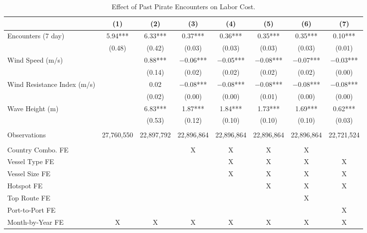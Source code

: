 \begin{table}
\centering
\caption{Effect of Past Pirate Encounters on Labor Cost. \label{tab:spec-labor-table}}
\centering
\begin{adjustbox}{width = .9\textwidth}
\begin{threeparttable}
\begin{tabular}[t]{lccccccc}
\toprule
  & (1) & (2) & (3) & (4) & (5) & (6) & (7)\\
\midrule
Encounters (7 day) & \num{5.94}*** & \num{6.33}*** & \num{0.37}*** & \num{0.36}*** & \num{0.35}*** & \num{0.35}*** & \num{0.10}***\\
 & (\num{0.48}) & (\num{0.42}) & (\num{0.03}) & (\num{0.03}) & (\num{0.03}) & (\num{0.03}) & (\num{0.01})\\
Wind Speed (m/s) &  & \num{0.88}*** & \num{-0.06}*** & \num{-0.05}*** & \num{-0.08}*** & \num{-0.07}*** & \num{-0.03}***\\
 &  & (\num{0.14}) & (\num{0.02}) & (\num{0.02}) & (\num{0.02}) & (\num{0.02}) & (\num{0.00})\\
Wind Resistance Index (m/s) &  & \num{0.02} & \num{-0.08}*** & \num{-0.08}*** & \num{-0.08}*** & \num{-0.08}*** & \num{-0.08}***\\
 &  & (\num{0.02}) & (\num{0.00}) & (\num{0.00}) & (\num{0.01}) & (\num{0.00}) & (\num{0.00})\\
Wave Height (m) &  & \num{6.83}*** & \num{1.87}*** & \num{1.84}*** & \num{1.73}*** & \num{1.69}*** & \num{0.62}***\\
 &  & (\num{0.53}) & (\num{0.12}) & (\num{0.10}) & (\num{0.10}) & (\num{0.10}) & (\num{0.03})\\
 &  &  &  &  &  &  & \\
Observations & 27,760,550 & 22,897,792 & 22,896,864 & 22,896,864 & 22,896,864 & 22,896,864 & 22,721,524\\
 &  &  &  &  &  &  & \\
Country Combo. FE &  &  & X & X & X & X & \\
Vessel Type FE &  &  &  & X & X & X & X\\
Vessel Size FE &  &  &  & X & X & X & X\\
Hotspot FE &  &  &  &  & X & X & X\\
Top Route FE &  &  &  &  &  & X & \\
Port-to-Port FE &  &  &  &  &  &  & X\\
Month-by-Year FE & X & X & X & X & X & X & X\\
\bottomrule
\end{tabular}

\end{threeparttable}
\end{adjustbox}
\end{table}
